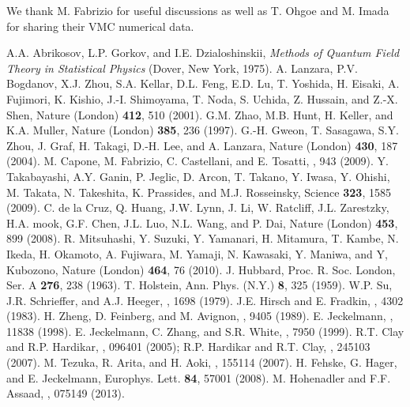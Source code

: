 \documentclass[aps,superscriptaddress,amsmath,amssymb,twocolumn,showpacs,floatfix,english]{revtex4}
\begin{document}
\acknowledgments

We thank M. Fabrizio for useful discussions as well as T. Ohgoe and M. Imada for sharing their VMC numerical data. 

\begin{thebibliography}{99}
 A.A. Abrikosov, L.P. Gorkov, and I.E. Dzialoshinskii, {\it Methods of Quantum Field Theory in Statistical Physics}
   (Dover, New York, 1975).
 A. Lanzara, P.V. Bogdanov, X.J. Zhou, S.A. Kellar, D.L. Feng, E.D. Lu, T. Yoshida, H. Eisaki, A. Fujimori, 
   K. Kishio, J.-I. Shimoyama, T. Noda, S. Uchida, Z. Hussain, and Z.-X. Shen, Nature (London) {\bf 412}, 510 (2001).
 G.M. Zhao, M.B. Hunt, H. Keller, and K.A. Muller, Nature (London) {\bf 385}, 236 (1997).
 G.-H. Gweon, T. Sasagawa, S.Y. Zhou, J. Graf, H. Takagi, D.-H. Lee, and A. Lanzara, Nature (London) {\bf 430}, 
   187 (2004).
 M. Capone, M. Fabrizio, C. Castellani, and E. Tosatti, , 943 (2009).
 Y. Takabayashi, A.Y. Ganin, P. Jeglic, D. Arcon, T. Takano, Y. Iwasa, Y. Ohishi, M. Takata, N. Takeshita, 
   K. Prassides, and M.J. Rosseinsky, Science {\bf 323}, 1585 (2009).
 C. de la Cruz, Q. Huang, J.W. Lynn, J. Li, W. Ratcliff, J.L. Zarestzky, H.A. mook, G.F.  Chen, J.L. Luo, N.L. Wang,
   and P. Dai, Nature (London) {\bf 453}, 899 (2008).
 R. Mitsuhashi, Y. Suzuki, Y. Yamanari, H. Mitamura, T. Kambe, N. Ikeda, H. Okamoto, A. Fujiwara, M. Yamaji, 
   N. Kawasaki, Y. Maniwa, and Y, Kubozono, Nature (London) {\bf 464}, 76 (2010).
 J. Hubbard, Proc. R. Soc. London, Ser. A {\bf 276}, 238 (1963).
 T. Holstein, Ann. Phys. (N.Y.) {\bf 8}, 325 (1959).
 W.P. Su, J.R. Schrieffer, and A.J. Heeger, , 1698 (1979).
 J.E. Hirsch and E. Fradkin, , 4302 (1983).
 H. Zheng, D. Feinberg, and M. Avignon, , 9405 (1989).
 E. Jeckelmann, , 11838 (1998).
 E. Jeckelmann, C. Zhang, and S.R. White, , 7950 (1999).
 R.T. Clay and R.P. Hardikar, , 096401 (2005); R.P. Hardikar and R.T. Clay, , 245103 (2007).
 M. Tezuka, R. Arita, and H. Aoki, , 155114 (2007).
 H. Fehske, G. Hager, and E. Jeckelmann, Europhys. Lett. {\bf 84}, 57001 (2008).
 M. Hohenadler and F.F. Assaad, , 075149 (2013).

\end{thebibliography}
\end{document}
